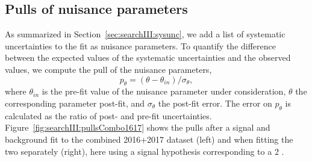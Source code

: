 \subsection{Pulls of nuisance parameters}
\label{sec:searchIII:pulls}
As summarized in Section~\ref{sec:searchIII:sysunc}, we add a list of systematic uncertainties to the fit as nuisance parameters.
To quantify the difference between the expected values of the systematic uncertainties and the observed values, we compute the pull of the nuisance parameters,
\begin{equation}
p_{\theta} = (\theta - \theta_{in})/\sigma_\theta,
\end{equation}
where $\theta_{in}$ is the pre-fit value of the nuisance parameter under consideration, $\theta$ the corresponding parameter post-fit, and $\sigma_\theta$ the post-fit error. The error on $p_{\theta}$ is calculated as the ratio of post- and pre-fit uncertainties. Figure~\ref{fig:searchIII:pullsCombo1617} shows the pulls after a signal and background fit to the combined 2016+2017 dataset (left) and when fitting the two separately (right), here using a signal hypothesis corresponding to a 2 \TeV \BulkG.
